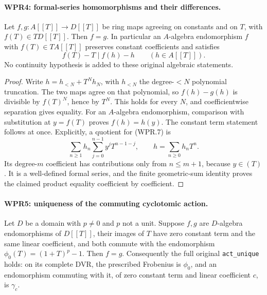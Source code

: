\paragraph{WPR4: formal-series homomorphisms and their differences.}
\label{claim:WPR4}
Let $f,g:A[[T]]\to D[[T]]$ be ring maps agreeing on constants
and on $T$, with $f(T)\in TD[[T]]$. Then $f=g$.
In particular an $A$-algebra endomorphism $f$ with $f(T)\in TA[[T]]$
preserves constant coefficients and satisfies
\[
                         f(T)-T\mid f(h)-h
                  \qquad(h\in A[[T]]).
 \tag{WPR.7}
\]
No continuity hypothesis is added to these original algebraic statements.

\begin{proof}
Write $h=h_{<N}+T^Nh_N$, with $h_{<N}$ the degree-$<N$
polynomial truncation. The two maps agree on that polynomial,
so $f(h)-g(h)$ is divisible by $f(T)^N$, hence by $T^N$.
This holds for every $N$, and coefficientwise separation gives
equality. For an $A$-algebra endomorphism, comparison with
substitution at $y=f(T)$ proves $f(h)=h(y)$. The constant term
statement follows at once. Explicitly, a quotient for (WPR.7) is
\[
 \sum_{n\geq1}h_n\sum_{j=0}^{n-1}y^jT^{n-1-j},
              \qquad h=\sum_{n\geq0}h_nT^n.
\]
Its degree-$m$ coefficient has contributions only from $n\leq m+1$,
because $y\in(T)$. It is a well-defined formal series, and the
finite geometric-sum identity proves the claimed product equality
coefficient by coefficient.
\end{proof}

\paragraph{WPR5: uniqueness of the commuting cyclotomic action.}
\label{claim:WPR5}
Let $D$ be a domain with $p\neq0$ and $p$ not a unit.
Suppose $f,g$ are $D$-algebra endomorphisms of $D[[T]]$,
their images of $T$ have zero constant term and the same linear
coefficient, and both commute with the endomorphism
$\phi_0(T)=(1+T)^p-1$. Then $f=g$.
Consequently the full original \texttt{act\_unique} holds:
on its complete DVR, the prescribed Frobenius is $\phi_0$,
and an endomorphism commuting with it, of zero constant term and
linear coefficient $c$, is $\gamma_c$.

